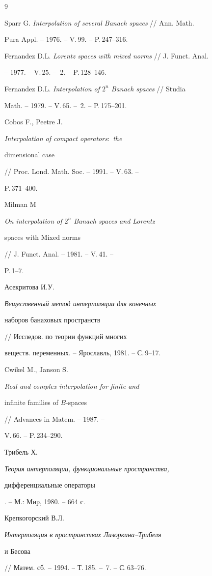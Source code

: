 \begin{thebibliography}{9}







Sparr G. {\em Interpolation of several Banach spaces} // Ann. Math. 


Pura Appl. -- 1976. -- V.\,99. -- P.\,247--316. 




Fernandez D.L. {\em Lorentz spaces with mixed norms} // J. Funct. Anal. 


-- 1977. -- V.\,25. -- \No\,2. -- P.\,128--146. 




Fernandez D.L. {\em Interpolation of $2^n$ Banach spaces} // Studia 


Math. -- 1979. -- V.\,65. -- \No\,2. -- P.\,175--201. 




Cobos F., Peetre J. {\em Interpolation of compact operators$:$ the 


dimensional case} // Proc. Lond. Math. Soc. -- 1991. -- V.\,63. -- 


P.\,371--400. 




Milman M {\em On interpolation of $2^n$ Banach spaces and Lorentz 


spaces with Mixed norms} // J. Funct. Anal. -- 1981. -- V.\,41. -- 


P.\,1--7. 




Асекритова И.У. {\em Вещественный метод интерполяции для конечных 


наборов банаховых пространств} // Исследов. по теории функций многих 


веществ. переменных. -- Ярославль, 1981. -- С.\,9--17. 




Cwikel M., Janson S. {\em Real and complex interpolation for finite and 


infinite families of $B$-spaces} // Advances in Matem. -- 1987. -- 


V.\,66. -- P.\,234--290. 




Трибель Х. {\em Теория интерполяции, функциональные пространства, 


дифференциальные операторы}. -- М.: Мир, 1980. -- 664 с. 




Крепкогорский В.Л. {\em Интерполяция в пространствах Лизоркина--Трибеля 


и Бесова} // Матем. сб. -- 1994. -- Т.\,185. -- \No\,7. -- С.\,63--76. 





\end{thebibliography}





